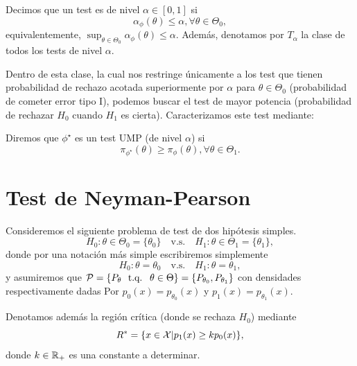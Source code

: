  \begin{definition}
 Decimos que un test es de nivel $\alpha\in[0,1]$ si 
\begin{equation}
 		\alpha_\phi(\theta)\leq\alpha, \forall \theta\in\Theta_0,
 	\end{equation}
 	equivalentemente, $\sup_{\theta\in\Theta_0}\alpha_\phi(\theta)\leq\alpha$. Además, denotamos por $T_\alpha$ la clase de todos los tests de nivel $\alpha$. 
 \end{definition}
 Dentro de esta clase, la cual nos restringe únicamente a los test que tienen probabilidad de rechazo acotada superiormente por $\alpha$  para $\theta\in\Theta_0$ (probabilidad de cometer error tipo I), podemos buscar el test de mayor potencia (probabilidad de rechazar $H_0$ cuando $H_1$ es cierta). Caracterizamos este test mediante: 

 \begin{definition}
 	Diremos que $\phi^\star$ es un test UMP (de nivel $\alpha$)  si 
 	\begin{equation}
 		\pi_{\phi^\star}(\theta)\geq \pi_{\phi}(\theta), \forall\theta\in\Theta_1.
 	\end{equation}
 	
 \end{definition}


\section{Test de Neyman-Pearson} 
\label{sub:test_de_neyman_pearson}
Consideremos el siguiente problema de test de dos hipótesis simples. 
\begin{equation}
	H_0:\theta\in\Theta_0=\{\theta_0\}\quad \text{v.s.}\quad H_1:\theta\in\Theta_1=\{\theta_1\},
\end{equation}
donde por una notación más simple escribiremos simplemente 
\begin{equation}
	H_0:\theta =\theta_0\quad \text{v.s.}\quad H_1:\theta = \theta_1,		
\end{equation}
y asumiremos que $\mathcal{P} = \{P_\theta\ {\text{ t.q. }}\ \theta\in\Theta\}=\{P_{\theta_0},P_{\theta_1}\}$ con densidades respectivamente dadas Por $p_0(x) = p_{\theta_0}(x)$ y $p_1(x) = p_{\theta_1}(x)$.

Denotamos además la región crítica (donde se rechaza $H_0$) mediante
\begin{equation}
	\label{eq:R_NR}
	R^* = \{x\in{\mathcal X} | p_1(x) \geq k p_0(x)\},
\end{equation}
donde $k\in{\mathbb R}_+$ es una constante a determinar. 

